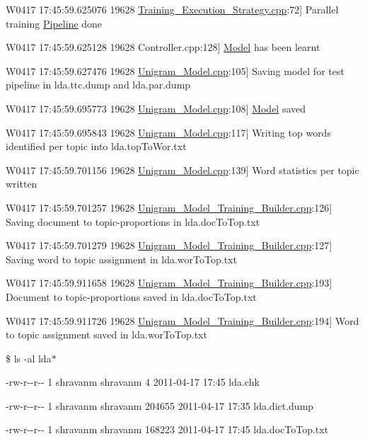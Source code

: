 {\ttfamily W0417 17:45:59.625076 19628 \hyperlink{_training___execution___strategy_8cpp}{Training\_\-Execution\_\-Strategy.cpp}:72\mbox{]} Parallel training \hyperlink{class_pipeline}{Pipeline} done  }

{\ttfamily W0417 17:45:59.625128 19628 Controller.cpp:128\mbox{]} \hyperlink{class_model}{Model} has been learnt  }

{\ttfamily W0417 17:45:59.627476 19628 \hyperlink{_unigram___model_8cpp}{Unigram\_\-Model.cpp}:105\mbox{]} Saving model for test pipeline in lda.ttc.dump and lda.par.dump  }

{\ttfamily W0417 17:45:59.695773 19628 \hyperlink{_unigram___model_8cpp}{Unigram\_\-Model.cpp}:108\mbox{]} \hyperlink{class_model}{Model} saved  }

{\ttfamily W0417 17:45:59.695843 19628 \hyperlink{_unigram___model_8cpp}{Unigram\_\-Model.cpp}:117\mbox{]} Writing top words identified per topic into lda.topToWor.txt  }

{\ttfamily W0417 17:45:59.701156 19628 \hyperlink{_unigram___model_8cpp}{Unigram\_\-Model.cpp}:139\mbox{]} Word statistics per topic written  }

{\ttfamily W0417 17:45:59.701257 19628 \hyperlink{_unigram___model___training___builder_8cpp}{Unigram\_\-Model\_\-Training\_\-Builder.cpp}:126\mbox{]} Saving document to topic-\/proportions in lda.docToTop.txt  }

{\ttfamily W0417 17:45:59.701279 19628 \hyperlink{_unigram___model___training___builder_8cpp}{Unigram\_\-Model\_\-Training\_\-Builder.cpp}:127\mbox{]} Saving word to topic assignment in lda.worToTop.txt  }

{\ttfamily W0417 17:45:59.911658 19628 \hyperlink{_unigram___model___training___builder_8cpp}{Unigram\_\-Model\_\-Training\_\-Builder.cpp}:193\mbox{]} Document to topic-\/proportions saved in lda.docToTop.txt  }

{\ttfamily W0417 17:45:59.911726 19628 \hyperlink{_unigram___model___training___builder_8cpp}{Unigram\_\-Model\_\-Training\_\-Builder.cpp}:194\mbox{]} Word to topic assignment saved in lda.worToTop.txt  }

{\ttfamily \$ ls -\/al lda$\ast$ }

{\ttfamily -\/rw-\/r-\/-\/r-\/-\/ 1 shravanm shravanm 4 2011-\/04-\/17 17:45 lda.chk  }

{\ttfamily -\/rw-\/r-\/-\/r-\/-\/ 1 shravanm shravanm 204655 2011-\/04-\/17 17:35 lda.dict.dump  }

{\ttfamily -\/rw-\/r-\/-\/r-\/-\/ 1 shravanm shravanm 168223 2011-\/04-\/17 17:45 lda.docToTop.txt  }

